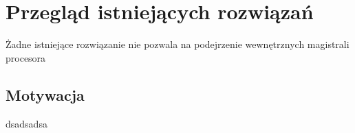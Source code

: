 \chapter{Przegląd istniejących rozwiązań}
	Żadne istniejące rozwiązanie nie pozwala na podejrzenie wewnętrznych magistrali procesora
	
	\section{Motywacja}
	dsadsadsa